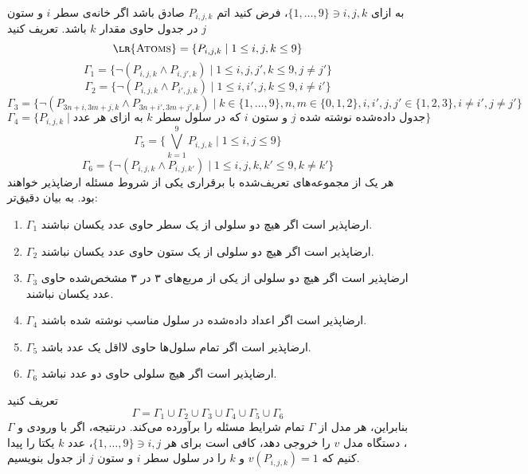\begin{ans}
  به ازای $\{ 1, \dots, 9 \} \ni i,j,k$، فرض کنید اتم $P_{i,j,k}$ صادق باشد اگر خانه‌ی سطر $i$ و ستون $j$ در جدول حاوی مقدار $k$ باشد. تعریف کنید
  \[ {\textsc{\lr{Atoms}}} = \{ P_{i,j,k} \mid 1 \le i,j,k \le 9 \} \]
  \[ \Gamma_1 = \{ \neg (P_{i,j,k} \wedge P_{i,j',k}) \mid 1 \le i,j,j',k \le 9, j \neq j' \} \]
  \[ \Gamma_2 = \{ \neg (P_{i,j,k} \wedge P_{i',j,k}) \mid 1 \le i,i',j,k \le 9, i \neq i' \} \]
  \[ \Gamma_3 = \{ \neg (P_{3 n + i, 3 m + j, k} \wedge P_{3 n + i', 3 m + j', k}) \mid k \in \{1,\dots,9\}, n,m \in \{0,1,2\}, i,i',j,j' \in \{1,2,3\}, i \neq i', j \neq j' \} \]
  \[ \Gamma_4 = \{ P_{i,j,k} \mid \text{به ازای هر عدد $k$ که در سلول سطر $i$ و ستون $j$ جدول داده‌شده نوشته شده} \} \]
  \[ \Gamma_5 = \{ \bigvee_{k=1}^9 P_{i,j,k} \mid 1 \le i, j \le 9\} \]
  \[ \Gamma_6 = \{ \neg (P_{i,j,k} \wedge P_{i,j,k'}) \mid 1 \le i,j,k,k' \le 9, k \neq k' \} \]
  هر یک از مجموعه‌های تعریف‌شده با برقراری یکی از شروط مسئله ارضاپذیر خواهند بود. به بیان دقیق‌تر:
  \begin{enumerate}[label=\alph*-]
    \item $\Gamma_1$ ارضاپذیر است اگر هیچ دو سلولی از یک سطر حاوی عدد یکسان نباشند.
    \item $\Gamma_2$ ارضاپذیر است اگر هیچ دو سلولی از یک ستون حاوی عدد یکسان نباشند.
    \item $\Gamma_3$ ارضاپذیر است اگر هیچ دو سلولی از یکی از مربع‌های ۳ در ۳ مشخص‌شده حاوی عدد یکسان نباشند.
    \item $\Gamma_4$ ارضاپذیر است اگر اعداد داده‌شده در سلول مناسب نوشته شده باشند.
    \item $\Gamma_5$ ارضاپذیر است اگر تمام سلول‌ها حاوی لااقل یک عدد باشد.
    \item $\Gamma_6$ ارضاپذیر است اگر هیچ سلولی حاوی دو عدد نباشد.
  \end{enumerate}
  تعریف کنید
  \[ \Gamma = \Gamma_1 \cup \Gamma_2 \cup \Gamma_3 \cup \Gamma_4 \cup \Gamma_5 \cup \Gamma_6 \]
  بنابراین، هر مدل از $\Gamma$ تمام شرایط مسئله را برآورده می‌کند. درنتیجه، اگر با ورودی \textsc{} و $\Gamma$، دستگاه مدل $v$ را خروجی دهد، کافی است برای هر $\{1, \dots, 9\} \ni i,j$، عدد $k$ یکتا را پیدا کنیم که $v(P_{i,j,k}) = 1$ و $k$ را در سلول سطر $i$ و ستون $j$ از جدول بنویسیم.
\end{ans}